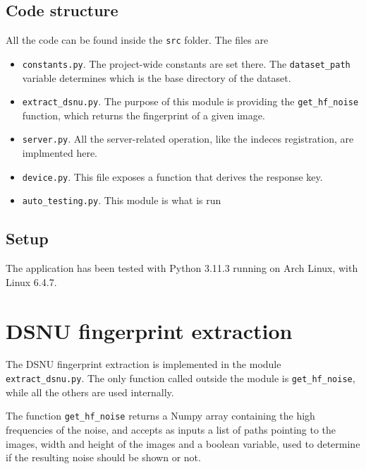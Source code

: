\subsection{Code structure}\label{sec:projectstructure}
All the code can be found inside the \texttt{src} folder. The files are
\begin{itemize}
\item \texttt{constants.py}. The project-wide constants are set there. The \texttt{dataset\_path} variable determines which is the base directory of the dataset.
\item \texttt{extract\_dsnu.py}. The purpose of this module is providing the \texttt{get\_hf\_noise} function, which returns the fingerprint of a given image.
\item \texttt{server.py}. All the server-related operation, like the indeces registration, are implmented here.
\item \texttt{device.py}. This file exposes a function that derives the response key.
\item \texttt{auto\_testing.py}. This module is what is run
\end{itemize}

\subsection{Setup}\label{subsec:setup}
The application has been tested with Python 3.11.3 running on Arch Linux, with Linux 6.4.7.

\section{DSNU fingerprint extraction}\label{sec:dsnu_extraction}
The DSNU fingerprint extraction is implemented in the module \texttt{extract\_dsnu.py}. The only function called outside the module is \texttt{get\_hf\_noise}, while all the others are used internally.

The function \texttt{get\_hf\_noise} returns a Numpy array containing the high frequencies of the noise, and accepts as inputs a list of paths pointing to the images, width and height of the images and a boolean variable, used to determine if the resulting noise should be shown or not.

